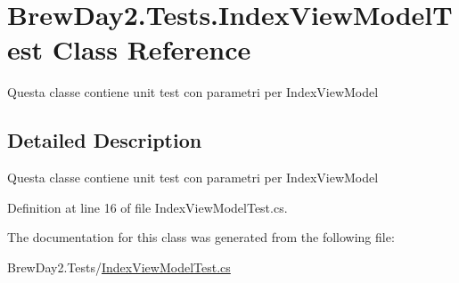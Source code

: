 \hypertarget{class_brew_day2_1_1_tests_1_1_index_view_model_test}{}\section{Brew\+Day2.\+Tests.\+Index\+View\+Model\+Test Class Reference}
\label{class_brew_day2_1_1_tests_1_1_index_view_model_test}


Questa classe contiene unit test con parametri per Index\+View\+Model 




\subsection{Detailed Description}
Questa classe contiene unit test con parametri per Index\+View\+Model



Definition at line 16 of file Index\+View\+Model\+Test.\+cs.



The documentation for this class was generated from the following file\+:\begin{DoxyCompactItemize}
\item 
Brew\+Day2.\+Tests/\mbox{\hyperlink{_index_view_model_test_8cs}{Index\+View\+Model\+Test.\+cs}}\end{DoxyCompactItemize}
